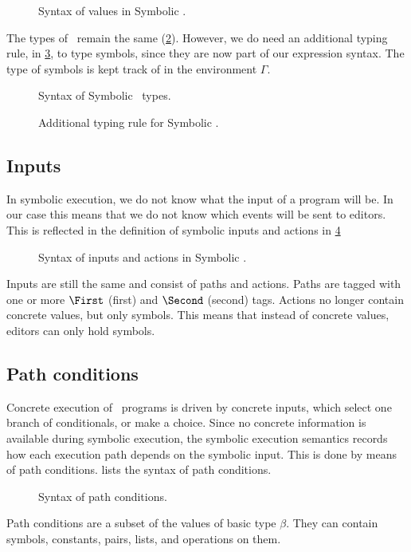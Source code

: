 \begin{figure}[ht]
  \small
  \caption{Syntax of values in Symbolic \TOPHAT.}
  \label{fig:syntaxvalues}
\end{figure}

The types of \STOPHAT\ remain the same (\cref{fig:syntaxtypes}).
However, we do need an additional typing rule,  in \cref{fig:typingsymbol}, to type symbols,
since they are now part of our expression syntax.
The type of symbols is kept track of in the environment $\Gamma$.

\begin{figure}[t]
  \small
  \caption{Syntax of Symbolic \TOPHAT\ types.}
  \label{fig:syntaxtypes}
\end{figure}

\begin{figure}[t]
  \small
  \caption{Additional typing rule for Symbolic \TOPHAT.}
  \label{fig:typingsymbol}
\end{figure}



\subsection{Inputs}

In symbolic execution, we do not know what the input of a program will be.
In our case this means that we do not know which events will be sent to editors.
This is reflected in the definition of symbolic inputs and actions in \cref{fig:syntaxinputs}

\begin{figure}[ht]
  \small
  \caption{Syntax of inputs and actions in Symbolic \TOPHAT.}
  \label{fig:syntaxinputs}
\end{figure}

Inputs are still the same and consist of paths and actions.
Paths are tagged with one or more $\First$ (first) and $\Second$ (second) tags.
Actions no longer contain concrete values, but only symbols.
This means that instead of concrete values, editors can only hold symbols.



\subsection{Path conditions}

Concrete execution of \TOPHAT\ programs is driven by concrete inputs, which select one branch of conditionals, or make a choice.
Since no concrete information is available during symbolic execution, the symbolic execution semantics records how each execution path depends on the symbolic input.
This is done by means of path conditions.
 lists the syntax of path conditions.

\begin{figure}[ht]
  \small
  \caption{Syntax of path conditions.}
  \label{fig:syntaxpredicates}
\end{figure}

Path conditions are a subset of the values of basic type $\beta$.
They can contain symbols, constants, pairs, lists, and operations on them.
